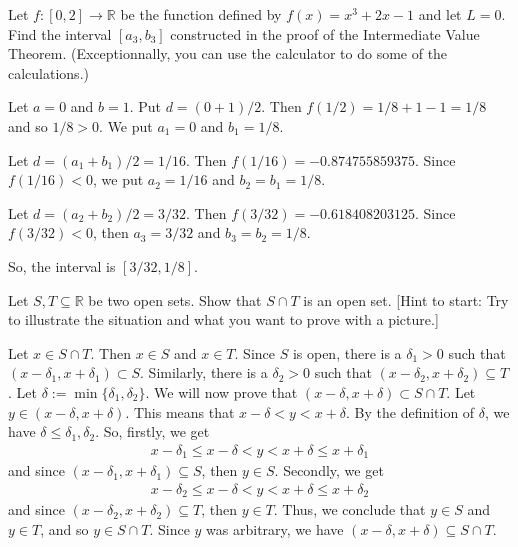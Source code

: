 \documentclass[addpoints, 12pt]{exam}%
\newcommand{\bR}{\mathbb{R}}
\newcommand{\ra}{\rightarrow}
\theoremstyle{definition}
\begin{document}
\begin{questions}

\question[10]
Let $f: [0, 2] \ra \bR$ be the function defined by $f(x) = x^3 + 2x - 1$ and let $L = 0$. Find the interval $[a_3, b_3]$ constructed in the proof of the Intermediate Value Theorem. (Exceptionnally, you can use the calculator to do some of the calculations.)
	
	\begin{solution}
	Let $a = 0$ and $b= 1$. Put $d = (0 + 1)/2$. Then $f (1/2) = 1/8 + 1 - 1 = 1/8$ and so $1/8 > 0$. We put $a_1 = 0$ and $b_1 = 1/8$.
	
	Let $d = (a_1 + b_1)/2 = 1/16$. Then $f(1/16) = -0.874755859375
$. Since $f(1/16) < 0$, we put $a_2 = 1/16$ and $b_2 = b_1 = 1/8$.

	Let $d = (a_2 + b_2)/2 = 3/32$. Then $f(3/32) = -0.618408203125
$. Since $f(3/32) < 0$, then $a_3 = 3/32$ and $b_3 = b_2 = 1/8$.

	So, the interval is $[3/32 , 1/8]$.
	\end{solution}
\newpage

\question[10]
Let $S , T \subseteq \bR$ be two open sets. Show that $S \cap T$ is an open set. [Hint to start: Try to illustrate the situation and what you want to prove with a picture.]

	\begin{solution}
	Let $x \in S \cap T$. Then $x \in S$ and $x \in T$. Since $S$ is open, there is a $\delta_1 > 0$ such that $(x - \delta_1 , x + \delta_1 ) \subset S$. Similarly, there is a $\delta_2 > 0$ such that $(x - \delta_2 , x + \delta_2) \subseteq T$. Let $\delta := \min \{ \delta_1 , \delta_2 \}$. We will now prove that $(x - \delta , x + \delta ) \subset S \cap T$. Let $y \in (x - \delta , x + \delta )$. This means that $x - \delta < y < x + \delta$. By the definition of $\delta$, we have $\delta \leq \delta_1 , \delta_2$. So, firstly, we get 
		\begin{align*}
		x - \delta_1 \leq x - \delta < y < x + \delta \leq x + \delta_1
		\end{align*}
	and since $(x - \delta_1 , x + \delta_1 ) \subseteq S$, then $y \in S$. Secondly, we get
		\begin{align*}
		x - \delta_2 \leq x - \delta < y < x + \delta \leq x + \delta_2
		\end{align*}
	and since $(x - \delta_2 , x + \delta_2 ) \subseteq T$, then $y \in T$. Thus, we conclude that $y \in S$ and $y \in T$, and so $y \in S \cap T$. Since $y$ was arbitrary, we have $(x - \delta , x + \delta ) \subseteq S \cap T$.
	\end{solution}
	
	
\end{questions}
\end{document}
